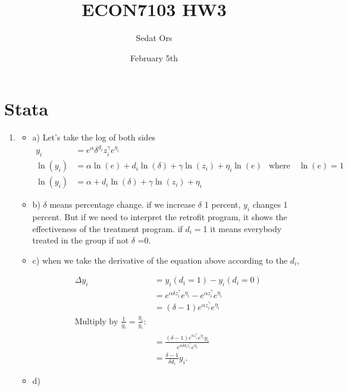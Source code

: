 \documentclass{article}
\title{ECON7103 HW3}
\author{Sedat Ors}
\date{February 5th}
\begin{document}
\maketitle

\section{Stata}

\begin{enumerate}
\item

\begin{itemize}
\item a)
\vspace{0.5cm}
Let's take the log of both sides
\begin{align}
y_i &= e^{\alpha} \delta^{d_i} z_i^{\gamma} e^{\eta_i} \\
\ln(y_i) &= \alpha \ln(e) + d_i \ln(\delta) + \gamma \ln(z_i) + \eta_i \ln(e) & \text{where} \quad \ln(e) = 1 \\
\ln(y_i) &= \alpha + d_i \ln(\delta) + \gamma \ln(z_i) + \eta_i
\end{align}
\vspace{0.5cm}

\item b)
$\delta$ means percentage change. if we increase $\delta$ 1 percent, ${y_i}$ changes 1 percent.  But if we need to interpret the retrofit program, it shows the effectiveness of the treatment program. if ${d_i} = $1 
it means everybody treated in the group if not $\delta$ =0. 
\vspace{0.5cm}

\item c)
when we take the derivative of the equation above according to the ${d_i}$,

\begin{align}
\Delta y_i &= y_i(d_i = 1) - y_i(d_i = 0)  \\
&= e^{\alpha\delta z_i^\gamma} e^{\eta_i} - e^{\alpha z_i^\gamma} e^{\eta_i} \\
&= (\delta - 1)e^{\alpha z_i^\gamma} e^{\eta_i} \\
\text{Multiply by } \frac{1}{y_i} = \frac{y_i}{y_i}: \\
&= \frac{(\delta - 1)e^{\alpha z_i^\gamma} e^{\eta_i} y_i}{e^{\alpha\delta d_i z_i^\gamma} e^{\eta_i}} \\
&= \frac{\delta - 1}{\delta d_i} y_i.
\end{align}

\item d)


\end{itemize}
\end{enumerate}
\end{document}
